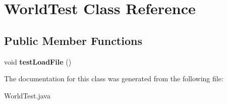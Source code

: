 \hypertarget{class_world_test}{}\section{World\+Test Class Reference}
\label{class_world_test}
\subsection*{Public Member Functions}
\begin{DoxyCompactItemize}
\item 
\hypertarget{class_world_test_a51f1814bf8bfec8588f5fe6c2a269679}{}void {\bfseries test\+Load\+File} ()\label{class_world_test_a51f1814bf8bfec8588f5fe6c2a269679}

\end{DoxyCompactItemize}


The documentation for this class was generated from the following file\+:\begin{DoxyCompactItemize}
\item 
World\+Test.\+java\end{DoxyCompactItemize}
